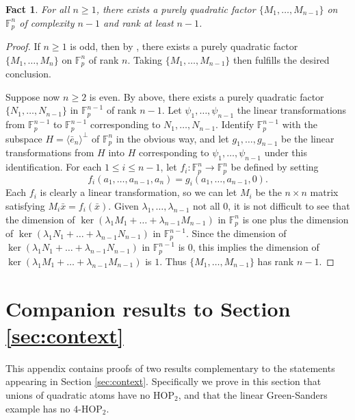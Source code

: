 \documentclass[12pt,oneside,british,a4wide]{amsart}
\newtheorem{fact}[theorem]{Fact}
\numberwithin{equation}{section}
\theoremstyle{definition}
\def\F{\mathbb{F}}
\def\HOP{\mathrm{HOP}}
\newcommand{\ebar}{\bar{e}}
\newcommand{\xbar}{\bar{x}}
\begin{document}
\begin{fact}\label{fact:basisrestate}
For all $n\geq 1$, there exists a purely quadratic factor $\{M_1,\ldots, M_{n-1}\}$ on $\F_p^n$ of complexity $n-1$ and rank at least $n-1$.
\end{fact}
\begin{proof}
If $n\geq 1$ is odd, then by  \cite[Lemma 3]{Dumas.2011}, there exists a purely quadratic factor $\{M_1,\ldots, M_n\}$ on $\F_p^n$ of rank $n$.  Taking $\{M_1,\ldots, M_{n-1}\}$ then fulfills the desired conclusion. 
 

Suppose now $n\geq 2$ is even. By above, there exists a purely quadratic factor $\{N_1,\ldots, N_{n-1}\}$  in $\F_p^{n-1}$ of rank $n-1$.  Let $\psi_1,\ldots,\psi_{n-1}$ the linear transformations from $\F_p^{n-1}$ to $\F_p^{n-1}$ corresponding to $N_1,\ldots, N_{n-1}$.  Identify $\F_p^{n-1}$ with the subspace $H=\langle \ebar_n\rangle^{\perp}$ of $\F_p^n$ in the obvious way, and let $g_1,\ldots, g_{n-1}$ be the linear transformations from $H$ into $H$ corresponding to $\psi_1,\ldots, \psi_{n-1}$ under this identification.  For each $1\leq i\leq n-1$, let $f_i:\F_p^n\rightarrow \F_p^n$ be defined by setting
$$
f_i(a_1,\ldots,a_{n-1},a_n)=g_i(a_1,\ldots,a_{n-1},0).
$$
Each $f_i$ is clearly a linear transformation, so we can let $M_i$ be the $n\times n$ matrix satisfying $M_i\xbar=f_i(\xbar)$. Given $\lambda_1,\ldots, \lambda_{n-1}$ not all $0$, it is not difficult to see that the dimension of $\ker(\lambda_1M_1+\ldots+\lambda_{n-1}M_{n-1})$ in $\F_p^n$ is one plus the dimension of $\ker(\lambda_1N_1+\ldots+\lambda_{n-1}N_{n-1})$ in $\F_p^{n-1}$.  Since the dimension of  $\ker(\lambda_1N_1+\ldots+\lambda_{n-1}N_{n-1})$ in $\F_p^{n-1}$ is $0$, this implies the dimension of $\ker(\lambda_1M_1+\ldots+\lambda_{n-1}M_{n-1})$ is $1$.  Thus $\{M_1,\ldots, M_{n-1}\}$ has rank $n-1$.
\end{proof}



\section{Companion results to Section \ref{sec:context}}\label{app:generalprops}

This appendix contains proofs of two results complementary to the statements appearing in Section \ref{sec:context}.  Specifically we prove in this section that unions of quadratic atoms have no $\HOP_2$, and that the linear Green-Sanders example has no $4$-$\HOP_2$.
\end{document}
